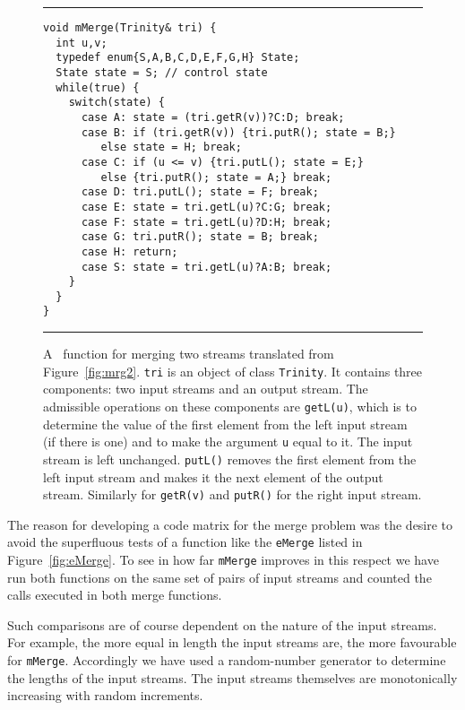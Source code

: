 \documentclass[preprint,11pt]{elsarticle}
\begin{document}
\begin{figure}[htbp]
\hrule \vspace{0.1in}
\begin{center}
\begin{minipage}{4in}
{\footnotesize
\begin{verbatim}
void mMerge(Trinity& tri) {
  int u,v;
  typedef enum{S,A,B,C,D,E,F,G,H} State;
  State state = S; // control state
  while(true) {
    switch(state) {
      case A: state = (tri.getR(v))?C:D; break;
      case B: if (tri.getR(v)) {tri.putR(); state = B;}
         else state = H; break;
      case C: if (u <= v) {tri.putL(); state = E;}
         else {tri.putR(); state = A;} break;
      case D: tri.putL(); state = F; break;
      case E: state = tri.getL(u)?C:G; break;
      case F: state = tri.getL(u)?D:H; break;
      case G: tri.putR(); state = B; break;
      case H: return;
      case S: state = tri.getL(u)?A:B; break;
    }
  }
}
\end{verbatim}
} \end{minipage}
\end{center}
\caption{\label{fig:mMerge}
A \cpp\ function for merging two streams
translated from Figure~\ref{fig:mrg2}.
{\tt tri} is an object of class {\tt Trinity}.
It contains three components: two input streams and an output stream. 
The admissible operations on these components are
{\tt getL(u)}, which is to determine the value
of the first element from the
left input stream (if there is one) and to make the argument
{\tt u} equal to it. The input stream is left unchanged.
{\tt putL()} removes the first element from the left input
stream and makes it the next element of the output stream.
Similarly for {\tt getR(v)} and {\tt putR()}
for the right input stream.
}
\vspace{0.1in}
\hrule
\end{figure}

The reason for developing a code matrix for the merge problem
was the desire to avoid the superfluous tests of a function
like the {\tt eMerge} listed in Figure~\ref{fig:eMerge}.
To see in how far {\tt mMerge} improves in this respect
we have run both functions on the same set of pairs of input
streams and counted the calls executed in both merge functions.

Such comparisons are of course dependent on the nature of the
input streams.
For example, the more equal in length the input streams are,
the more favourable for {\tt mMerge}.
Accordingly we have used a random-number generator
to determine the lengths of the input streams.
The input streams themselves are monotonically
increasing with random increments.
\end{document}
